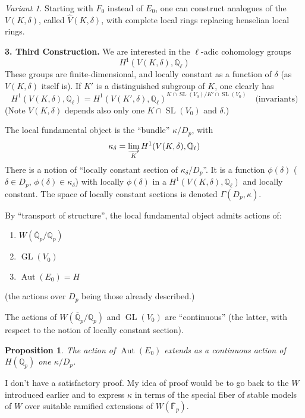 \documentclass[11pt,a4paper]{article}
\theoremstyle{plain}
\newtheorem{proposition}[theorem]{Proposition}
\theoremstyle{definition}
\theoremstyle{remark}
\newtheorem*{variant}{Variant}
\DeclareMathOperator{\Aut}{Aut}
\DeclareMathOperator{\GL}{GL}
\DeclareMathOperator{\SL}{SL}
\newcommand{\Qpbar}{\overline{\mathbb{Q}}_{p}}
\newcommand{\Fpbar}{\overline{\mathbb{F}}_{p}}
\newcommand{\Qp}{\mathbb{Q}_{p}}
\newcommand{\Ql}{\mathbb{Q}_{\ell}}
\begin{document}
\begin{variant}
Starting with $F_{0}$ instead of $E_{0}$, one can construct analogues of the $V(K, \delta)$, called $\widehat{V}(K, \delta)$, with complete local rings replacing henselian local rings.
\end{variant}

\medskip

\noindent
\textbf{3. Third Construction.} We are interested in the $\ell$-adic cohomology groups
\[
H^{1}(V(K, \delta), \Ql)
\]
These groups are finite-dimensional, and locally constant as a function of $\delta$ (as $V(K, \delta)$ itself is). If $K'$ is a distinguished subgroup of $K$, one clearly has
\[
H^{1}(V(K, \delta), \Ql) = H^{1}(V(K', \delta), \Ql)^{K \cap \SL(V_{0})/K' \cap \SL(V_{0})} \quad \text{(invariants)}
\]
(Note $V(K, \delta)$ depends also only one $K \cap \SL(V_{0})$ and $\delta$.)

The local fundamental object is the ``bundle'' $\kappa/D_{p}$, with
\[
\kappa_{\delta} = \varinjlim_{K} H^{1}(V(K, \delta), \Ql)
\]
There is a notion of ``locally constant section of $\kappa_{\delta}/D_{p}$''. It is a function $\phi(\delta)$ ($\delta \in D_{p}$, $\phi(\delta) \in \kappa_{\delta}$) with locally $\phi(\delta)$ in a $H^{1}(V(K, \delta), \Ql)$ and locally constant. The space of locally constant sections is denoted $\Gamma(D_{p}, \kappa)$.

By ``transport of structure'', the local fundamental object admits actions of:
\begin{enumerate}[label=(\alph*)]
\item $W(\Qpbar/\Qp)$
\item $\GL(V_{0})$
\item $\Aut(E_{0}) = H$
\end{enumerate}
(the actions over $D_{p}$ being those already described.)

The actions of $W(\Qpbar/\Qp)$ and $\GL(V_{0})$ are ``continuous'' (the latter, with respect to the notion of locally constant section).

\begin{proposition}
The action of $\Aut(E_{0})$ extends as a continuous action of $H(\Qp)$ one $\kappa/D_{p}$.
\end{proposition}

I don't have a satisfactory proof. My idea of proof would be to go back to the $W$ introduced earlier and to express $\kappa$ in terms of the special fiber of stable models of $W$ over suitable ramified extensions of $W(\Fpbar)$.
\end{document}
